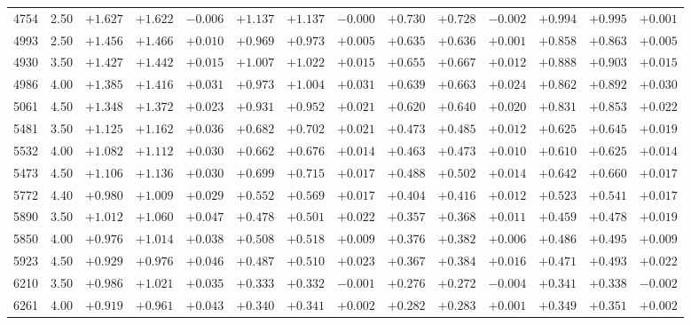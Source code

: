 \documentclass[]{aa}
\begin{document}
\begin{appendix}
\begin{table*}
\begin{center}
\begin{tabular}{llllllllllllll}
4754  &2.50 & $+1.627$ & $+1.622$ & $-0.006$ & $+1.137$ & $+1.137$ & $-0.000$ & $+0.730$ & $+0.728$ & $-0.002$ & $+0.994$ & $+0.995$ & $+0.001$ \\
4993  &2.50 & $+1.456$ & $+1.466$ & $+0.010$ & $+0.969$ & $+0.973$ & $+0.005$ & $+0.635$ & $+0.636$ & $+0.001$ & $+0.858$ & $+0.863$ & $+0.005$ \\
4930  &3.50 & $+1.427$ & $+1.442$ & $+0.015$ & $+1.007$ & $+1.022$ & $+0.015$ & $+0.655$ & $+0.667$ & $+0.012$ & $+0.888$ & $+0.903$ & $+0.015$ \\
4986  &4.00 & $+1.385$ & $+1.416$ & $+0.031$ & $+0.973$ & $+1.004$ & $+0.031$ & $+0.639$ & $+0.663$ & $+0.024$ & $+0.862$ & $+0.892$ & $+0.030$ \\
5061  &4.50 & $+1.348$ & $+1.372$ & $+0.023$ & $+0.931$ & $+0.952$ & $+0.021$ & $+0.620$ & $+0.640$ & $+0.020$ & $+0.831$ & $+0.853$ & $+0.022$ \\
5481  &3.50 & $+1.125$ & $+1.162$ & $+0.036$ & $+0.682$ & $+0.702$ & $+0.021$ & $+0.473$ & $+0.485$ & $+0.012$ & $+0.625$ & $+0.645$ & $+0.019$ \\
5532  &4.00 & $+1.082$ & $+1.112$ & $+0.030$ & $+0.662$ & $+0.676$ & $+0.014$ & $+0.463$ & $+0.473$ & $+0.010$ & $+0.610$ & $+0.625$ & $+0.014$ \\
5473  &4.50 & $+1.106$ & $+1.136$ & $+0.030$ & $+0.699$ & $+0.715$ & $+0.017$ & $+0.488$ & $+0.502$ & $+0.014$ & $+0.642$ & $+0.660$ & $+0.017$ \\
5772  &4.40 & $+0.980$ & $+1.009$ & $+0.029$ & $+0.552$ & $+0.569$ & $+0.017$ & $+0.404$ & $+0.416$ & $+0.012$ & $+0.523$ & $+0.541$ & $+0.017$ \\
5890  &3.50 & $+1.012$ & $+1.060$ & $+0.047$ & $+0.478$ & $+0.501$ & $+0.022$ & $+0.357$ & $+0.368$ & $+0.011$ & $+0.459$ & $+0.478$ & $+0.019$ \\
5850  &4.00 & $+0.976$ & $+1.014$ & $+0.038$ & $+0.508$ & $+0.518$ & $+0.009$ & $+0.376$ & $+0.382$ & $+0.006$ & $+0.486$ & $+0.495$ & $+0.009$ \\
5923  &4.50 & $+0.929$ & $+0.976$ & $+0.046$ & $+0.487$ & $+0.510$ & $+0.023$ & $+0.367$ & $+0.384$ & $+0.016$ & $+0.471$ & $+0.493$ & $+0.022$ \\
6210  &3.50 & $+0.986$ & $+1.021$ & $+0.035$ & $+0.333$ & $+0.332$ & $-0.001$ & $+0.276$ & $+0.272$ & $-0.004$ & $+0.341$ & $+0.338$ & $-0.002$ \\
6261  &4.00 & $+0.919$ & $+0.961$ & $+0.043$ & $+0.340$ & $+0.341$ & $+0.002$ & $+0.282$ & $+0.283$ & $+0.001$ & $+0.349$ & $+0.351$ & $+0.002$ \\

\end{tabular}
\end{center}
\end{table*}
\end{appendix}
\end{document}
